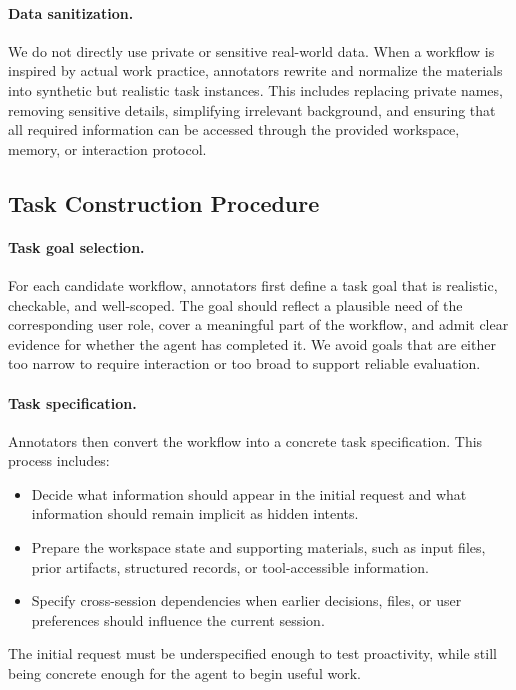 \documentclass{llmxive}
\begin{document}
\paragraph{Data sanitization.}
We do not directly use private or sensitive real-world data. When a workflow is inspired by actual work practice, annotators rewrite and normalize the materials into synthetic but realistic task instances. This includes replacing private names, removing sensitive details, simplifying irrelevant background, and ensuring that all required information can be accessed through the provided workspace, memory, or interaction protocol.

\subsection{Task Construction Procedure}
\label{app:task_construction_procedure}

\paragraph{Task goal selection.}
For each candidate workflow, annotators first define a task goal that is realistic, checkable, and well-scoped. The goal should reflect a plausible need of the corresponding user role, cover a meaningful part of the workflow, and admit clear evidence for whether the agent has completed it. We avoid goals that are either too narrow to require interaction or too broad to support reliable evaluation.

\paragraph{Task specification.}
Annotators then convert the workflow into a concrete task specification. This process includes:
\begin{itemize}[leftmargin=10pt, topsep=0pt, itemsep=1pt, partopsep=1pt, parsep=1pt]
    \item Decide what information should appear in the initial request and what information should remain implicit as hidden intents.
    \item Prepare the workspace state and supporting materials, such as input files, prior artifacts, structured records, or tool-accessible information.
    \item Specify cross-session dependencies when earlier decisions, files, or user preferences should influence the current session.
\end{itemize}
The initial request must be underspecified enough to test proactivity, while still being concrete enough for the agent to begin useful work.
\end{document}
